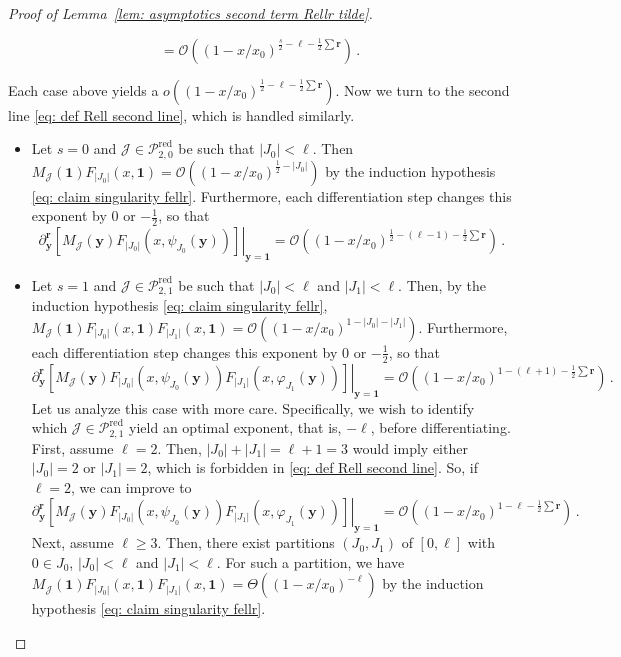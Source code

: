 \documentclass[10pt,a4paper]{amsart}
\newcommand{\abs}[1]{{\left|#1\right|}}
\newcommand{\br}{{\mathbf{r}}}
\newcommand{\by}{{\mathbf{y}}}
\newcommand{\cJ}{\mathcal{J}}
\newcommand{\cO}{\mathcal{O}}
\newcommand{\cP}{\mathcal{P}}
\newcommand{\red}{\mathrm{red}}
\begin{document}
\begin{proof}[Proof of Lemma~\ref{lem: asymptotics second term Rellr tilde}]
\begin{itemize}
\[        = \cO\left( (1-x/x_0)^{\frac{s}{2}-\ell-\frac12\sum\br} \right) \,.
    \]
\end{itemize}
Each case above yields a $o\left( (1-x/x_0)^{\frac12-\ell-\frac12\sum\br} \right)$.
Now we turn to the second line \eqref{eq: def Rell second line}, which is handled similarly.
\begin{itemize}
    \item Let $s=0$ and $\cJ\in\cP_{2,0}^\red$ be such that $\abs{J_0}<\ell$.
    Then $M_\cJ(\bm{1}) F_{\abs{J_0}}(x,\bm{1}) = \cO\left( (1-x/x_0)^{\frac12-\abs{J_0}} \right)$ by the induction hypothesis \eqref{eq: claim singularity fellr}.
    Furthermore, each differentiation step changes this exponent by $0$ or $-\frac12$, so that
    \[
        \partial_\by^\br \left. \left[ M_\cJ(\by) F_{\abs{J_0}}\left( x,\psi_{J_0}(\by) \right) \right] \right\vert_{\by=\bm{1}} 
        = \cO\left( (1-x/x_0)^{\frac12-(\ell-1)-\frac12\sum\br} \right) \,.
    \]
    \item Let $s=1$ and $\cJ\in\cP_{2,1}^\red$ be such that $\abs{J_0}<\ell$ and $\abs{J_1}<\ell$.
    Then, by the induction hypothesis \eqref{eq: claim singularity fellr}, $M_\cJ(\bm{1}) F_{\abs{J_0}}(x,\bm{1}) F_{\abs{J_1}}(x,\bm{1}) = \cO\left( (1-x/x_0)^{1-\abs{J_0}-\abs{J_1}} \right)$.
    Furthermore, each differentiation step changes this exponent by $0$ or $-\frac12$, so that
    \[
        \partial_\by^\br \left. \left[ M_\cJ(\by) F_{\abs{J_0}}\left( x,\psi_{J_0}(\by) \right) F_{\abs{J_1}}\left( x,\varphi_{J_1}(\by) \right) \right] \right\vert_{\by=\bm{1}} 
        = \cO\left( (1-x/x_0)^{1-(\ell+1)-\frac12\sum\br} \right) \,.
    \]
    Let us analyze this case with more care.
    Specifically, we wish to identify which $\cJ\in\cP_{2,1}^\red$ yield an optimal exponent, that is, $-\ell$, before differentiating.
    First, assume $\ell=2$.
    Then, $\abs{J_0}+\abs{J_1} = \ell+1 = 3$ would imply either $\abs{J_0}=2$ or $\abs{J_1}=2$, which is forbidden in \eqref{eq: def Rell second line}.
    So, if $\ell=2$, we can improve to
    \[
        \partial_\by^\br \left. \left[ M_\cJ(\by) F_{\abs{J_0}}\left( x,\psi_{J_0}(\by) \right) F_{\abs{J_1}}\left( x,\varphi_{J_1}(\by) \right) \right] \right\vert_{\by=\bm{1}} 
        = \cO\left( (1-x/x_0)^{1-\ell-\frac12\sum\br} \right) \,.
    \]
    Next, assume $\ell\ge3$.
    Then, there exist partitions $(J_0,J_1)$ of $[0,\ell]$ with $0\in J_0$, $\abs{J_0}<\ell$ and $\abs{J_1}<\ell$.
    For such a partition, we have $M_\cJ(\bm{1}) F_{\abs{J_0}}(x,\bm{1}) F_{\abs{J_1}}(x,\bm{1}) = \Theta\left( (1-x/x_0)^{-\ell} \right)$ by the induction hypothesis \eqref{eq: claim singularity fellr}.

\end{itemize}
\end{proof}
\end{document}
